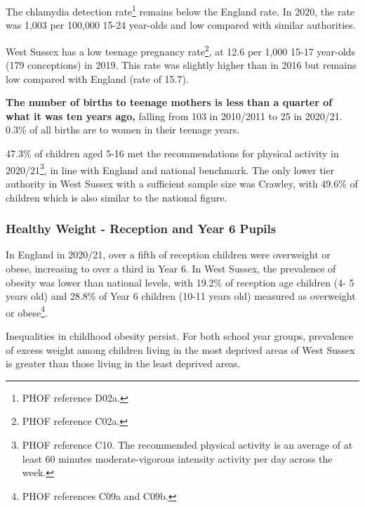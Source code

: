 The chlamydia detection rate\footnote{PHOF reference D02a.} remains below the England rate. In 2020, the rate was 1,003 per 100,000 15-24 year-olds and low compared with similar authorities.

West Sussex has a low teenage pregnancy rate\footnote{PHOF reference C02a.}, at 12.6 per 1,000 15-17 year-olds (179 conceptions) in 2019. This rate was slightly higher than in 2016 but remains low compared with England (rate of 15.7).


{\bfseries The number of births to teenage mothers is less than a quarter of what it was ten years ago,} falling from 103 in 2010/2011 to 25 in 2020/21. 0.3\% of all births are to women in their teenage years. 

47.3\% of children aged 5-16 met the recommendations for physical activity in 2020/21\footnote{PHOF reference C10. The recommended physical activity is an average of at least 60 minutes moderate-vigorous intensity activity per day across the week.}, in line with England and national benchmark. The only lower tier authority in West Sussex with a sufficient sample size was Crawley, with 49.6\% of children which is also similar to the national figure.

\subsubsection{Healthy Weight - Reception and Year 6 Pupils}
In England in 2020/21, over a fifth of reception children were overweight or obese, increasing to over a third in Year 6. In West Sussex, the prevalence of obesity was lower than national levels, with 19.2\% of reception age children (4- 5 years old) and 28.8\% of Year 6 children (10-11 years old) measured as overweight or obese\footnote{PHOF references C09a and C09b.}.


Inequalities in childhood obesity persist. For both school year groups, prevalence of excess weight among children living in the most deprived areas of West Sussex is greater than those living in the least deprived areas.


